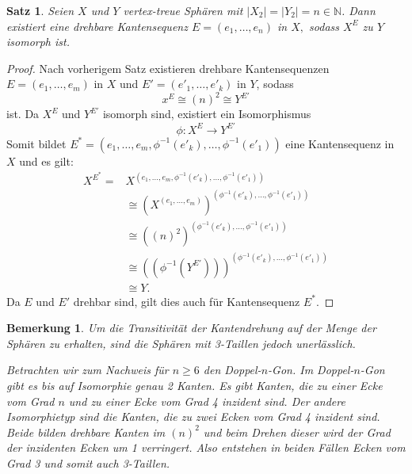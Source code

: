 \documentclass[12pt,titlepage,twoside,cleardoublepage]{article}
\theoremstyle{nummermitklammern}
\newtheorem{bemerkung}[temp]{Bemerkung}
\newtheorem{satz}[temp]{Satz}
\newtheorem{bemerkung}[zahl]{Bemerkung}
\newtheorem{satz}[zahl]{Satz}
\numberwithin{equation}{section}
\begin{document}
\begin{satz} \label{kantendrehung}
Seien $X$ und $Y$ vertex-treue Sphären mit $\vert X_2\vert=\vert Y_2\vert=n\in \mathbb{N}$.
Dann existiert eine drehbare Kantensequenz $E=(e_1,\ldots,e_n)$ in $X,$ sodass  $X^E$ zu $Y$ isomorph ist. 
\end{satz}
\begin{proof}
Nach vorherigem Satz existieren drehbare Kantensequenzen $E=(e_1,\ldots,e_m)$ in $X$ und $E'=(e'_1,\ldots,e'_{k})$ in $Y$, sodass 
\[
x^E\cong (n)^2 \cong Y^{E'}
\] ist.
Da $X^E$ und $Y^{E'}$ isomorph sind, existiert ein Isomorphismus 
\[
\phi: X^E\to Y^{E'}
\]
Somit bildet $E^*=(e_1,\ldots,e_m,\phi^{-1}(e'_{k}),\ldots,\phi^{-1}(e'_{1}))$ eine Kantensequenz in $X$ und es gilt:
\begin{align*}
X^{E^{*}} = &X^{(e_1,\ldots,e_m,\phi^{-1}(e'_{k}),\ldots,\phi^{-1}(e'_{1}))}\\
&\cong (X^{(e_1,\ldots,e_m)})^{(\phi^{-1}(e'_{k}),\ldots,\phi^{-1}(e'_{1}))}\\
&\cong ((n)^2)^{(\phi^{-1}(e'_{k}),\ldots,\phi^{-1}(e'_{1}))}\\
&\cong ((\phi^{-1}(Y^{E'})))^{(\phi^{-1}(e'_{k}),\ldots,\phi^{-1}(e'_{1}))}\\
&\cong Y .
\end{align*}
Da $E$ und $E'$ drehbar sind, gilt dies auch für Kantensequenz $E^*.$
\end{proof}
\begin{bemerkung}
 Um die Transitivität der Kantendrehung auf der Menge der Sphären zu erhalten, sind die Sphären mit 3-Taillen jedoch unerlässlich.

 Betrachten wir zum Nachweis für $n\geq 6$ den Doppel-$n$-Gon. Im Doppel-$n$-Gon gibt es bis auf Isomorphie genau 2 Kanten. Es gibt Kanten, die zu einer Ecke vom Grad $n$ und zu einer Ecke vom Grad 4 inzident sind. Der andere Isomorphietyp sind die Kanten, die zu zwei Ecken vom Grad 4 inzident sind. Beide bilden drehbare Kanten im $(n)^2$ und beim Drehen dieser wird der Grad der inzidenten Ecken um 1 verringert. Also entstehen in beiden Fällen Ecken vom Grad 3 und somit auch 3-Taillen.
\end{bemerkung}
\end{document}
